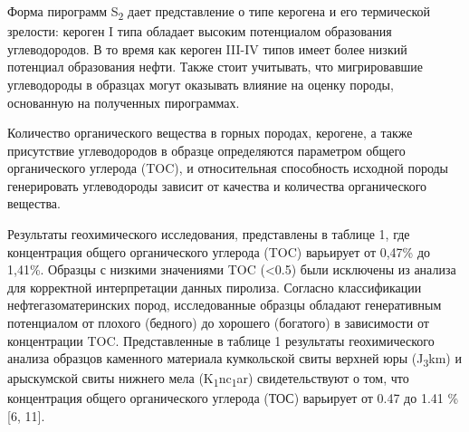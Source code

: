 \begin{multicols}{2}
Форма пирограмм S\textsubscript{2} дает представление о типе керогена и
его термической зрелости: кероген I типа обладает высоким потенциалом
образования углеводородов. В то время как кероген III-IV типов имеет
более низкий потенциал образования нефти. Также стоит учитывать, что
мигрировавшие углеводороды в образцах могут оказывать влияние на оценку
породы, основанную на полученных пирограммах.

Количество органического вещества в горных породах, керогене, а также
присутствие углеводородов в образце определяются параметром общего
органического углерода (TOC), и относительная способность исходной
породы генерировать углеводороды зависит от качества и количества
органического вещества.

Результаты геохимического исследования, представлены в таблице 1, где
концентрация общего органического углерода (TOC) варьирует от 0,47\% до
1,41\%. Образцы с низкими значениями TOC (\textless0.5) были исключены
из анализа для корректной интерпретации данных пиролиза. Согласно
классификации нефтегазоматеринских пород, исследованные образцы обладают
генеративным потенциалом от плохого (бедного) до хорошего (богатого) в
зависимости от концентрации TOC. Представленные в таблице 1 результаты
геохимического анализа образцов каменного материала кумкольской свиты
верхней юры (J\textsubscript{3}km) и арыскумской свиты нижнего мела
(K\textsubscript{1}nc\textsubscript{1}ar) свидетельствуют о том, что
концентрация общего органического углерода (ТОС) варьирует от 0.47 до
1.41 \% {[}6, 11{]}.
\end{multicols}

